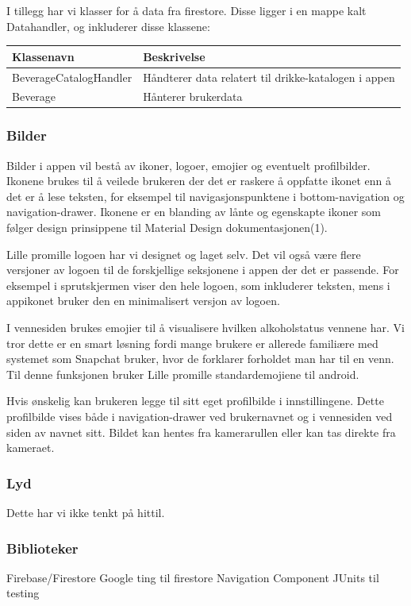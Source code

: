 I tillegg har vi klasser for å data fra firestore. Disse ligger i en mappe kalt Datahandler, og inkluderer disse klassene:

\begin{tabular}{ | m{4cm} | m{12cm} | } 
    \hline
    \textbf{Klassenavn} & \textbf{Beskrivelse} \\
    \hline
    BeverageCatalogHandler &
    Håndterer data relatert til drikke-katalogen i appen \\
    \hline
    Beverage &
    Hånterer brukerdata \\
    \hline
\end{tabular}

\subsubsection{Bilder}
Bilder i appen vil bestå av ikoner, logoer, emojier og eventuelt profilbilder. Ikonene brukes til å veilede brukeren der det er raskere å oppfatte ikonet enn å det er å lese teksten, for eksempel til navigasjonspunktene i bottom-navigation og navigation-drawer. Ikonene er en blanding av lånte og egenskapte ikoner som følger design prinsippene til Material Design dokumentasjonen(1).

Lille promille logoen har vi designet og laget selv. Det vil også være flere versjoner av logoen til de forskjellige seksjonene i appen der det er passende. For eksempel i sprutskjermen viser den hele logoen, som inkluderer teksten, mens i appikonet bruker den en minimalisert versjon av logoen.

I vennesiden brukes emojier til å visualisere hvilken alkoholstatus vennene har. Vi tror dette er en smart løsning fordi mange brukere er allerede familiære med systemet som Snapchat bruker, hvor de forklarer forholdet man har til en venn. Til denne funksjonen bruker Lille promille standardemojiene til android.

Hvis ønskelig kan brukeren legge til sitt eget profilbilde i innstillingene. Dette profilbilde vises både i navigation-drawer ved brukernavnet og i vennesiden ved siden av navnet sitt. Bildet kan hentes fra kamerarullen eller kan tas direkte fra kameraet.

\subsubsection{Lyd}
Dette har vi ikke tenkt på hittil.

\subsubsection{Biblioteker}
Firebase/Firestore
Google ting til firestore
Navigation Component
JUnits til testing

